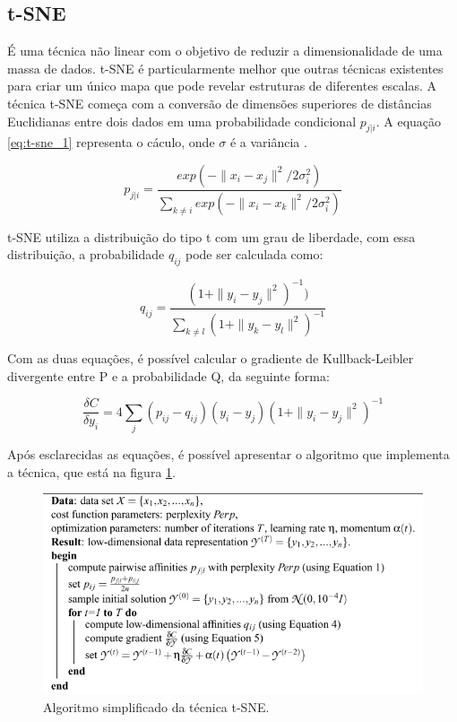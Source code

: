 \subsection{t-SNE}

É uma técnica não linear com o objetivo de reduzir a dimensionalidade de uma massa de dados. t-SNE é particularmente melhor que 
outras técnicas existentes para criar um único mapa que pode revelar estruturas de diferentes escalas. A técnica t-SNE começa com a 
conversão de dimensões superiores de distâncias Euclidianas entre dois dados em uma probabilidade condicional
$p_{j|i}$. A equação \ref{eq:t-sne_1} representa o cáculo, onde $\sigma$ é a variância \cite{VanDerMaaten2008}.

\begin{equation}\label{eq:t-sne_1}
    p_{j|i}=\frac{exp(-\parallel x_i-x_j\parallel^2/2\sigma_i^2)}{\sum_{k\ne i}{exp(-\parallel x_i-x_k\parallel^2/2\sigma_i^2)}}
\end{equation}

t-SNE utiliza a distribuição do tipo t com um grau de liberdade, com essa distribuição, a probabilidade $q_{ij}$ pode ser calculada como:

\begin{equation}\label{eq:t-sne_4}
    q_{ij}=\frac{(1+\parallel y_i-y_j\parallel^2)^{-1})}{\sum_{k\ne l}{(1 + \parallel y_k-y_l\parallel^2)^{-1}}}
\end{equation}

Com as duas equações, é possível calcular o gradiente de Kullback-Leibler  divergente entre P e a probabilidade Q, da seguinte forma:

\begin{equation}\label{eq:t-sne_5}
    \frac{\delta C}{\delta y_i} = 4 \sum_j{(p_{ij}-q_{ij})(y_i - y_j)(1+\parallel y_i-y_j\parallel^2)^{-1}}
\end{equation}

Após esclarecidas as equações, é possível apresentar o algoritmo que implementa a técnica, que está na figura \ref{fig:t-sne_algorithm_maaten_p9}.
\begin{figure}[H]
    \caption{Algoritmo simplificado da técnica t-SNE.}
    \begin{center}
        \includegraphics[scale=.45]{referencial/img/t-sne_algorithm_maaten_p9.png}
    \end{center}
    \label{fig:t-sne_algorithm_maaten_p9}
\end{figure}

